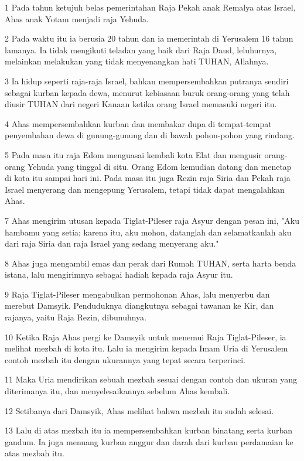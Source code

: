 \par 1 Pada tahun ketujuh belas pemerintahan Raja Pekah anak Remalya atas Israel, Ahas anak Yotam menjadi raja Yehuda.
\par 2 Pada waktu itu ia berusia 20 tahun dan ia memerintah di Yerusalem 16 tahun lamanya. Ia tidak mengikuti teladan yang baik dari Raja Daud, leluhurnya, melainkan melakukan yang tidak menyenangkan hati TUHAN, Allahnya.
\par 3 Ia hidup seperti raja-raja Israel, bahkan mempersembahkan putranya sendiri sebagai kurban kepada dewa, menurut kebiasaan buruk orang-orang yang telah diusir TUHAN dari negeri Kanaan ketika orang Israel memasuki negeri itu.
\par 4 Ahas mempersembahkan kurban dan membakar dupa di tempat-tempat penyembahan dewa di gunung-gunung dan di bawah pohon-pohon yang rindang.
\par 5 Pada masa itu raja Edom menguasai kembali kota Elat dan mengusir orang-orang Yehuda yang tinggal di situ. Orang Edom kemudian datang dan menetap di kota itu sampai hari ini. Pada masa itu juga Rezin raja Siria dan Pekah raja Israel menyerang dan mengepung Yerusalem, tetapi tidak dapat mengalahkan Ahas.
\par 7 Ahas mengirim utusan kepada Tiglat-Pileser raja Asyur dengan pesan ini, "Aku hambamu yang setia; karena itu, aku mohon, datanglah dan selamatkanlah aku dari raja Siria dan raja Israel yang sedang menyerang aku."
\par 8 Ahas juga mengambil emas dan perak dari Rumah TUHAN, serta harta benda istana, lalu mengirimnya sebagai hadiah kepada raja Asyur itu.
\par 9 Raja Tiglat-Pileser mengabulkan permohonan Ahas, lalu menyerbu dan merebut Damsyik. Penduduknya diangkutnya sebagai tawanan ke Kir, dan rajanya, yaitu Raja Rezin, dibunuhnya.
\par 10 Ketika Raja Ahas pergi ke Damsyik untuk menemui Raja Tiglat-Pileser, ia melihat mezbah di kota itu. Lalu ia mengirim kepada Imam Uria di Yerusalem contoh mezbah itu dengan ukurannya yang tepat secara terperinci.
\par 11 Maka Uria mendirikan sebuah mezbah sesuai dengan contoh dan ukuran yang diterimanya itu, dan menyelesaikannya sebelum Ahas kembali.
\par 12 Setibanya dari Damsyik, Ahas melihat bahwa mezbah itu sudah selesai.
\par 13 Lalu di atas mezbah itu ia mempersembahkan kurban binatang serta kurban gandum. Ia juga menuang kurban anggur dan darah dari kurban perdamaian ke atas mezbah itu.
